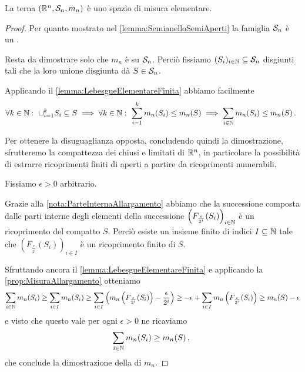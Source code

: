 \begin{theorem}\label{thm:LebesguePremisura}
	La terna $(\R^n,\S_n,m_n)$ è uno spazio di misura elementare.
\end{theorem}
\begin{proof}
	Per quanto mostrato nel \cref{lemma:SemianelloSemiAperti} la famiglia $\S_n$ è un \semiring{}.
	
	Resta da dimostrare solo che $m_n$ è \sigadd{} su $\S_n$.
	Perciò fissiamo $(S_i)_{i\in\N}\subseteq \S_n$ disgiunti tali che la loro unione disgiunta dà $S\in\S_n$.
	
	Applicando il \cref{lemma:LebesgueElementareFinita} abbiamo facilmente
	\begin{equation*}
		\forall k\in\N:\ \sqcup_{i=1}^k S_i\subseteq S\implies \forall k\in\N:\ \sum_{i=1}^k m_n(S_i)\le m_n(S) \implies \sum_{i\in\N}m_n(S_i)\le m_n(S) \punto
	\end{equation*}

	Per ottenere la disuguaglianza opposta, concludendo quindi la dimostrazione, sfrutteremo la compattezza dei chiusi e limitati di $\R^n$, in particolare la possibilità di estrarre ricoprimenti finiti di aperti a partire da ricoprimenti numerabili.
	
	Fissiamo $\epsilon>0$ arbitrario.
	
	Grazie alla \cref{nota:ParteInternaAllargamento} abbiamo che la successione composta dalle parti interne degli elementi della successione $\left(F_{\frac\epsilon{2^i}}(S_i)\right)_{i\in\N}$ è un ricoprimento del compatto $S$.
	Perciò esiste un insieme finito di indici $I\subseteq \N$ tale che $\left(F_{\frac\epsilon{2^i}}(S_i)\right)_{i\in I}$ è un ricoprimento finito di $S$.
	
	Sfruttando ancora il \cref{lemma:LebesgueElementareFinita} e applicando la \cref{prop:MisuraAllargamento} otteniamo
	\begin{equation*}
		\sum_{i\in\N}m_n(S_i)\ge \sum_{i\in I}m_n(S_i)\ge \sum_{i\in I}\left(m_n\left(F_{\frac\epsilon{2^i}}(S_i)\right)-\frac\epsilon{2^i}\right)
		\ge -\epsilon+\sum_{i\in I}m_n\left(F_{\frac\epsilon{2^i}}(S_i)\right)\ge m_n(S)-\epsilon
	\end{equation*}
	e visto che questo vale per ogni $\epsilon>0$ ne ricaviamo
	\begin{equation*}
		\sum_{i\in\N}m_n(S_i)\ge m_n(S) \virgola
	\end{equation*}
	che conclude la dimostrazione della \sigadd[ità] di $m_n$.
\end{proof}

